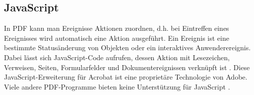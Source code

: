 \subsection{JavaScript}
In PDF kann man Ereignisse Aktionen zuordnen, d.h. bei Eintreffen eines Ereignisses wird automatisch eine Aktion ausgeführt. Ein Ereignis ist eine bestimmte Statusänderung von Objekten oder ein interaktives Anwenderereignis. Dabei lässt sich JavaScript-Code aufrufen, dessen Aktion mit Lesezeichen, Verweisen, Seiten, Formularfelder und Dokumentereignissen verknüpft ist \cite{softx}. Diese JavaScript-Erweiterung für Acrobat ist eine proprietäre Technologie von Adobe. Viele andere PDF-Programme bieten keine Unterstützung für JavaScript \cite{wiki-pdf-engl}. 